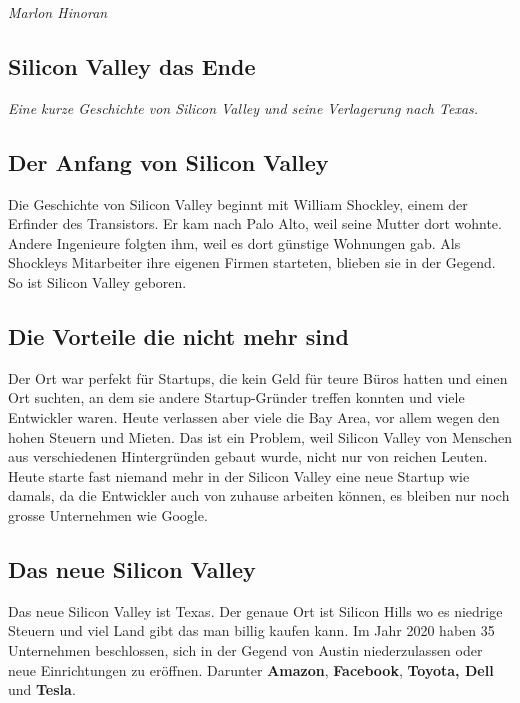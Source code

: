\documentclass[10pt]{article}
\begin{document}
\vspace{10pt} 
\textit{Marlon Hinoran}

\clearpage


\begin{center}
\section*{Silicon Valley das Ende}
\textit{Eine kurze Geschichte von Silicon Valley und seine Verlagerung nach Texas.}
\end{center}

\subsection*{Der Anfang von Silicon Valley}
Die Geschichte von Silicon Valley beginnt mit William Shockley, einem der Erfinder des Transistors. Er kam nach Palo Alto, weil seine Mutter dort wohnte. Andere Ingenieure folgten ihm, weil es dort günstige Wohnungen gab. Als Shockleys Mitarbeiter ihre eigenen Firmen starteten, blieben sie in der Gegend. So ist Silicon Valley geboren.

\subsection*{Die Vorteile die nicht mehr sind}
Der Ort war perfekt für Startups, die kein Geld für teure Büros hatten und einen Ort suchten, an dem sie andere Startup-Gründer treffen konnten und viele Entwickler waren. Heute verlassen aber viele die Bay Area, vor allem wegen den hohen Steuern und Mieten. Das ist ein Problem, weil Silicon Valley von Menschen aus verschiedenen Hintergründen gebaut wurde, nicht nur von reichen Leuten. Heute starte fast niemand mehr in der Silicon Valley eine neue Startup wie damals, da die Entwickler auch von zuhause arbeiten können, es bleiben nur noch grosse Unternehmen wie Google.

\subsection*{Das neue Silicon Valley}
Das neue Silicon Valley ist Texas. Der genaue Ort ist Silicon Hills wo es niedrige Steuern und viel Land gibt das man billig kaufen kann. Im Jahr 2020 haben 35 Unternehmen beschlossen, sich in der Gegend von Austin niederzulassen oder neue Einrichtungen zu eröffnen. Darunter \textbf{Amazon}, \textbf{Facebook}, \textbf{Toyota, Dell} und \textbf{Tesla}.
\end{document}
